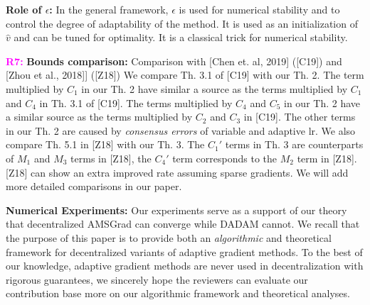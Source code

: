 \documentclass{article}
\begin{document}
\textbf{Role of $\epsilon$:} 
In the general framework, $\epsilon$ is used for numerical stability and to control the degree of adaptability of the method. It is used as an initialization of $\hat{v}$ and can be tuned for optimality. It is a classical trick for numerical stability.

\vspace{0.01in}

\textbf{\textcolor{magenta}{R7:}}
\textbf{Bounds comparison:} 
Comparison with [Chen et. al, 2019] ([C19]) and [Zhou et al., 2018]] ([Z18])
We compare Th. 3.1 of [C19] with our Th. 2. 
The term multiplied by $C_1$ in our Th. 2 have similar a source as the terms multiplied by $C_1$ and $C_4$ in Th. 3.1 of [C19]. 
The terms multiplied by $C_4$ and $C_5$ in our Th. 2 have a similar source as the terms multiplied by $C_2$ and $C_3$ in [C19]. 
The other terms in our Th. 2 are caused by \emph{consensus errors} of variable and adaptive lr. We also compare Th. 5.1 in [Z18] with our Th. 3. The $C_1'$ terms in Th. 3 are counterparts of $M_1$ and $M_3$ terms in [Z18], the $C_4'$ term corresponds to the $M_2$ term in [Z18]. 
[Z18] can show an extra improved rate assuming sparse gradients. 
We will add  more detailed comparisons in our paper. 


\textbf{Numerical Experiments:} 
Our experiments serve as a support of our theory that decentralized AMSGrad can converge while DADAM cannot.
We recall that the purpose of this paper is to provide both an \emph{algorithmic} and {theoretical} framework for decentralized variants of adaptive gradient methods. 
To the best of our knowledge, adaptive gradient methods are never used in decentralization with rigorous guarantees, we sincerely hope the reviewers can evaluate our contribution base more on our algorithmic framework and theoretical analyses.
\end{document}
